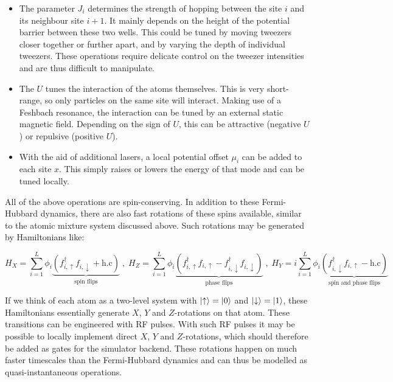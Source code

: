 \documentclass[a4paper, 10pt]{article}
\begin{document}
\begin{itemize}
    \item The parameter $J_i$ determines the strength of hopping between the site $i$ and its neighbour site $i+1$. It mainly depends on the height of the potential barrier between these two wells. This could be tuned by moving tweezers closer together or further apart, and by varying the depth of individual tweezers. These operations require delicate control on the tweezer intensities and are thus difficult to manipulate.
    
    \item The $U$ tunes the interaction of the atoms themselves.
    This is very short-range, so only particles on the same site will interact.
    Making use of a Feshbach resonance, the interaction can be tuned by an external static magnetic field.
    Depending on the sign of $U$, this can be attractive (negative $U$) or repulsive (positive $U$).
    
    \item With the aid of additional lasers, a local potential offset $\mu_i$ can be added to each site $x$. This simply raises or lowers the energy of that mode and can be tuned locally. 
    
    \end{itemize}
    
    All of the above operations are spin-conserving. In addition to these Fermi-Hubbard dynamics, there are also fast rotations of these spins available, similar to the atomic mixture system discussed above. Such rotations may be generated by Hamiltonians like:
    
\begin{equation}
    \label{eq:spin_flips}
    H_X = \sum_{i=1}^{L} \phi_i \underbrace{(f^\dag_{i,\uparrow} f_{i,\downarrow} + 
    \text{h.c})
    }_{\text{spin flips}} \;,
    \;
    H_Z = \sum_{i=1}^{L} \phi_i \underbrace{(f^\dag_{i, \uparrow} f_{i,\uparrow} - f^\dag_{i, \downarrow} f_{i,\downarrow} )}_{\text{phase flips}} \;,
    \;
    H_Y = i \sum_{i=1}^{L} \phi_i  \underbrace{(f^\dag_{i, \downarrow} f_{i,\uparrow} - 
    \text{h.c}
    )}_{\text{spin and phase flips}}
\end{equation}    
    
    If we think of each atom as a two-level system with $\ket{\uparrow} = \ket{0}$ and $\ket{\downarrow} = \ket{1}$, these Hamiltonians essentially generate $X$, $Y$ and $Z$-rotations on that atom. 
    These transitions can be engineered with RF pulses.
    With such RF pulses it may be possible to locally implement direct $X$, $Y$ and $Z$-rotations, which should therefore be added as gates for the simulator backend.
    These rotations happen on much faster timescales than the Fermi-Hubbard dynamics and can thus be modelled as quasi-instantaneous operations.  
\end{document}
